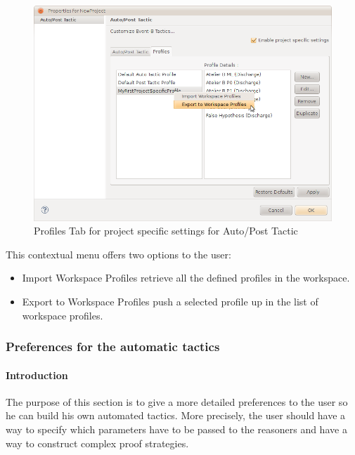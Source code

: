 \begin{figure}[!ht]
\begin{center}
	\includegraphics{img/reference/ref_01_preferences12.png}
	\caption{Profiles Tab for project specific settings for Auto/Post Tactic}
	\label{fig_ref_01_preferences12}
\end{center}
\end{figure}

This contextual menu offers two options to the user:

\begin{itemize}
	\item Import Workspace Profiles retrieve all the defined profiles in the workspace.
	\item Export to Workspace Profiles push a selected profile up in the list of workspace profiles.
\end{itemize}

\subsubsection{Preferences for the automatic tactics}
\label{preferences_for_the_automatic_tactics}

\paragraph{Introduction}

The purpose of this section is to give a more detailed preferences to the user so he can build his own automated tactics. More precisely, the user should have a way to specify which parameters have to be passed to the reasoners and have a way to construct complex proof strategies.

